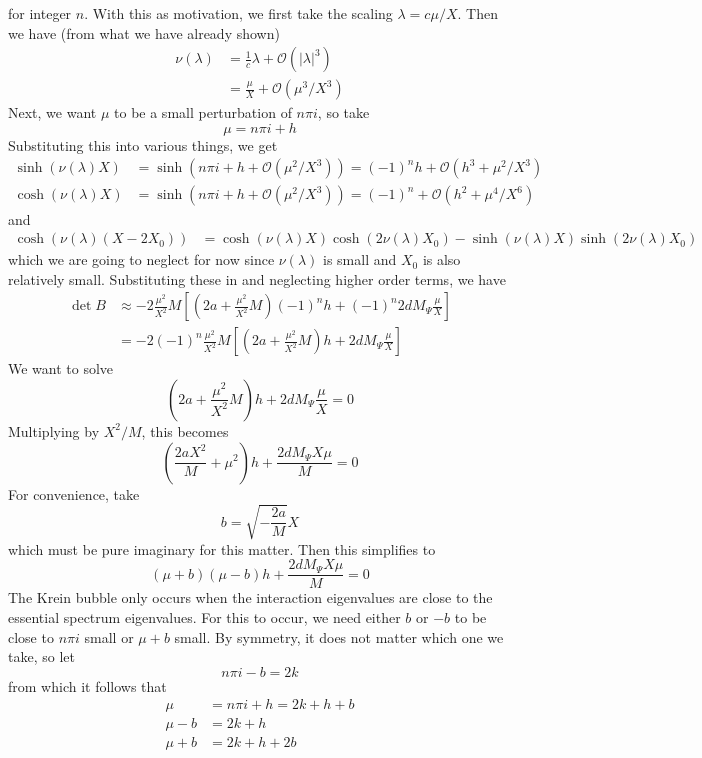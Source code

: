 \documentclass[thesis.tex]{subfiles}
\begin{document}
for integer $n$. With this as motivation, we first take the scaling $\lambda = c \mu / X$. Then we have (from what we have already shown)
\begin{align*}
\nu(\lambda) &= \frac{1}{c} \lambda + \mathcal{O}(|\lambda|^3) 
\\
&= \frac{\mu}{X} + \mathcal{O}(\mu^3 / X^3)
\end{align*}
Next, we want $\mu$ to be a small perturbation of $n \pi i$, so take 
\[
\mu = n \pi i + h
\]
Substituting this into various things, we get
\begin{align*}
\sinh(\nu(\lambda)X) &= \sinh(n \pi i + h + \mathcal{O}(\mu^2 / X^3)) = (-1)^n h + \mathcal{O}(h^3 + \mu^2 / X^3) \\
\cosh(\nu(\lambda)X) &= \sinh(n \pi i + h + \mathcal{O}(\mu^2 / X^3)) = (-1)^n +  \mathcal{O}(h^2 + \mu^4 / X^6)
\end{align*}
and
\begin{align*}
\cosh( \nu(\lambda)(X - 2 X_0))
&= \cosh( \nu(\lambda)X) \cosh(2 \nu(\lambda)X_0) 
- \sinh( \nu(\lambda)X) \sinh(2 \nu(\lambda)X_0) 
\end{align*}
which we are going to neglect for now since $\nu(\lambda)$ is small and $X_0$ is also relatively small. Substituting these in and neglecting higher order terms, we have
\begin{align*}
\det B &\approx -2 \frac{\mu^2}{X^2} M \left[ \left(2a + \frac{\mu^2}{X^2} M\right)(-1)^n h + (-1)^n 2 d M_\Psi \frac{\mu}{X} \right] \\
&= -2 (-1)^n \frac{\mu^2}{X^2} M \left[ \left(2a + \frac{\mu^2}{X^2} M\right) h + 2 d M_\Psi \frac{\mu}{X} \right] 
\end{align*}
We want to solve
\[
\left(2a + \frac{\mu^2}{X^2} M\right) h + 2 d M_\Psi \frac{\mu}{X} = 0
\]
Multiplying by $X^2/M$, this becomes
\[
\left(\frac{2aX^2}{M} + \mu^2 \right) h + \frac{2 d M_\Psi X \mu}{M} = 0
\]
For convenience, take
\[
b = \sqrt{-\frac{2a}{M}}X 
\]
which must be pure imaginary for this matter. Then this simplifies to
\[
(\mu + b)(\mu - b) h + \frac{2 d M_\Psi X \mu}{M} = 0
\]
The Krein bubble only occurs when the interaction eigenvalues are close to the essential spectrum eigenvalues. For this to occur, we need either $b$ or $-b$ to be close to $n \pi i$ small or $\mu + b$ small. By symmetry, it does not matter which one we take, so let
\[
n \pi i - b = 2 k
\]
from which it follows that
\begin{align*}
\mu &= n \pi i + h = 2 k + h + b \\
\mu - b &= 2 k + h \\
\mu + b &= 2 k + h + 2b
\end{align*}
\end{document}
